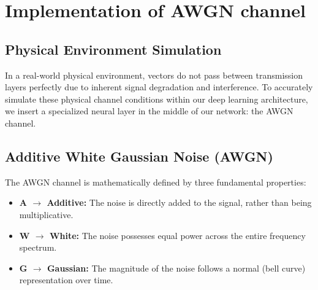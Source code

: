 \documentclass[12pt, a4paper, twocolumn]{article}
\begin{document}
\renewcommand{\thesection}{\Roman{section}} %
\setcounter{section}{25}   %
\setcounter{equation}{106} %
\setcounter{figure}{25}    %
\setcounter{table}{12}     %

\maketitle

\section{Implementation of AWGN channel}

\subsection{\textbf{Physical Environment Simulation}}
In a real-world physical environment, vectors do not pass between transmission layers perfectly due to inherent signal degradation and interference. To accurately simulate these physical channel conditions within our deep learning architecture, we insert a specialized neural layer in the middle of our network: the AWGN channel.

\subsection{\textbf{Additive White Gaussian Noise (AWGN)}}
The AWGN channel is mathematically defined by three fundamental properties:
\begin{itemize}
    \item \textbf{A $\rightarrow$ Additive:} The noise is directly added to the signal, rather than being multiplicative.
    \item \textbf{W $\rightarrow$ White:} The noise possesses equal power across the entire frequency spectrum.
    \item \textbf{G $\rightarrow$ Gaussian:} The magnitude of the noise follows a normal (bell curve) representation over time.
\end{itemize}
\end{document}

